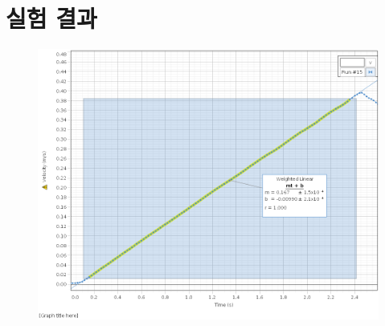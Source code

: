 \documentclass[12pt,a4paper]{article}
\begin{document}
\section{실험 결과}
\begin{figure}[h!]
    \centering
    \includegraphics[width=15cm]{W12_1.png}
\end{figure}
\end{document}
